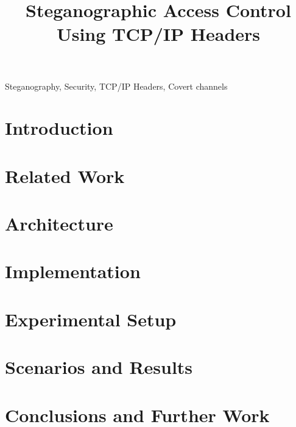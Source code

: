 \documentclass[conference]{IEEEtran}
\begin{document}
\title{Steganographic Access Control Using TCP/IP Headers}

\author{
}

\maketitle

\begin{abstract}

\end{abstract}


\begin{IEEEkeywords}
Steganography, Security, TCP/IP Headers, Covert channels
\end{IEEEkeywords}


\section{Introduction}
\label{sec:introduction}


\section{Related Work}
\label{sec:related}


\section{Architecture}
\label{sec:architecture}


\section{Implementation}
\label{sec:implementation}


\section{Experimental Setup}
\label{sec:setup}


\section{Scenarios and Results}
\label{sec:results}


\section{Conclusions and Further Work}
\label{sec:conclusion}




\end{document}
